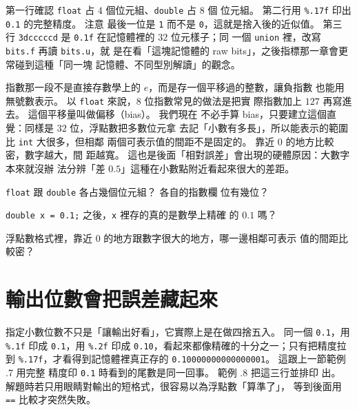 
第一行確認 \texttt{float} 占 $4$ 個位元組、\texttt{double} 占 $8$ 個
位元組。 第二行用 \texttt{\%.17f} 印出 \texttt{0.1} 的完整精度。 注意
最後一位是 \texttt{1} 而不是 \texttt{0}，這就是捨入後的近似值。 第三
行 \texttt{3dcccccd} 是 \texttt{0.1f} 在記憶體裡的 $32$ 位元樣子；同
一個 \texttt{union} 裡，改寫 \texttt{bits.f} 再讀 \texttt{bits.u}，就
是在看「這塊記憶體的 raw bits」，之後指標那一章會更常碰到這種「同一塊
記憶體、不同型別解讀」的觀念。

指數那一段不是直接存數學上的 $e$，而是存一個平移過的整數，讓負指數
也能用無號數表示。 以 \texttt{float} 來說，8 位指數常見的做法是把實
際指數加上 $127$ 再寫進去。 這個平移量叫做偏移（bias）。 我們現在
不必手算 bias，只要建立這個直覺：同樣是 $32$ 位，浮點數把多數位元拿
去記「小數有多長」，所以能表示的範圍比 \texttt{int} 大很多，但相鄰
兩個可表示值的間距不是固定的。 靠近 $0$ 的地方比較密，數字越大，間
距越寬。 這也是後面「相對誤差」會出現的硬體原因：大數字本來就沒辦
法分辨「差 $0.5$」這種在小數點附近看起來很大的差距。


\begin{drills}[label=drills:float-bit-repr]
\item \texttt{float} 跟 \texttt{double} 各占幾個位元組？ 各自的指數欄
位有幾位？
\item \texttt{double x = 0.1;} 之後，\texttt{x} 裡存的真的是數學上精確
的 $0.1$ 嗎？
\item 浮點數格式裡，靠近 $0$ 的地方跟數字很大的地方，哪一邊相鄰可表示
值的間距比較密？
\end{drills}

\section{輸出位數會把誤差藏起來}
\label{sec:float-hidden-error}

指定小數位數不只是「讓輸出好看」，它實際上是在做四捨五入。 同一個
\texttt{0.1}，用 \texttt{\%.1f} 印成 \texttt{0.1}，用 \texttt{\%.2f}
印成 \texttt{0.10}，看起來都像精確的十分之一；只有把精度拉到
\texttt{\%.17f}，才看得到記憶體裡真正存的
\texttt{0.10000000000000001}。 這跟上一節範例 \thechapter.7 用完整
精度印 \texttt{0.1} 時看到的尾數是同一回事。 範例 \thechapter.8 把這三行並排印
出。 解題時若只用眼睛對輸出的短格式，很容易以為浮點數「算準了」，
等到後面用 \texttt{==} 比較才突然失敗。

